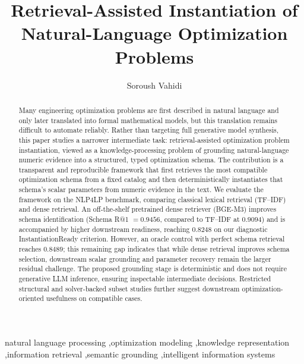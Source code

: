 \documentclass[3p]{elsarticle}
\begin{document}
\begin{frontmatter}

\title{Retrieval-Assisted Instantiation of Natural-Language Optimization Problems}

\author[cs]{Soroush Vahidi}

\begin{abstract}
Many engineering optimization problems are first described in natural language and only later translated into formal mathematical models, but this translation remains difficult to automate reliably. Rather than targeting full generative model synthesis, this paper studies a narrower intermediate task: retrieval-assisted optimization problem instantiation, viewed as a knowledge-processing problem of grounding natural-language numeric evidence into a structured, typed optimization schema. The contribution is a transparent and reproducible framework that first retrieves the most compatible optimization schema from a fixed catalog and then deterministically instantiates that schema's scalar parameters from numeric evidence in the text. We evaluate the framework on the NLP4LP benchmark, comparing classical lexical retrieval (TF--IDF) and dense retrieval. An off-the-shelf pretrained dense retriever (BGE-M3) improves schema identification (Schema R@1 $=0.9456$, compared to TF--IDF at $0.9094$) and is accompanied by higher downstream readiness, reaching $0.8248$ on our diagnostic InstantiationReady criterion. However, an oracle control with perfect schema retrieval reaches $0.8489$; this remaining gap indicates that while dense retrieval improves schema selection, downstream scalar grounding and parameter recovery remain the larger residual challenge. The proposed grounding stage is deterministic and does not require generative LLM inference, ensuring inspectable intermediate decisions. Restricted structural and solver-backed subset studies further suggest downstream optimization-oriented usefulness on compatible cases.
\end{abstract}

\begin{keyword}
natural language processing \sep optimization modeling \sep knowledge representation \sep information retrieval \sep semantic grounding \sep intelligent information systems
\end{keyword}

\end{frontmatter}
\end{document}
